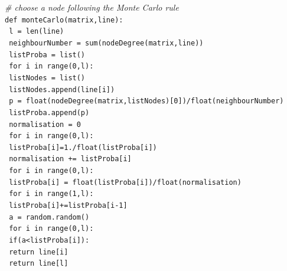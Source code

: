 \documentclass[a4paper]{report}
\begin{document}
\medbreak
\noindent     \textit{\# choose a node following the Monte Carlo rule}\\
\noindent     \texttt{def monteCarlo(matrix,line):}\\
\hspace*{1cm} \texttt{	l = len(line)}\\
\hspace*{1cm} \texttt{	neighbourNumber = sum(nodeDegree(matrix,line))}\\
\hspace*{1cm} \texttt{	listProba = list()}\\
\hspace*{1cm} \texttt{	for i in range(0,l):}\\
\hspace*{2cm} \texttt{		listNodes = list()}\\
\hspace*{2cm} \texttt{		listNodes.append(line[i])}\\
\hspace*{2cm} \texttt{		p = float(nodeDegree(matrix,listNodes)[0])/float(neighbourNumber)}\\
\hspace*{2cm} \texttt{		listProba.append(p)}\\
\hspace*{1cm} \texttt{	normalisation = 0}\\
\hspace*{1cm} \texttt{	for i in range(0,l):}\\
\hspace*{2cm} \texttt{		listProba[i]=1./float(listProba[i])}\\
\hspace*{2cm} \texttt{		normalisation += listProba[i]}\\
\hspace*{1cm} \texttt{	for i in range(0,l):}\\
\hspace*{2cm} \texttt{		listProba[i] = float(listProba[i])/float(normalisation)}\\
\hspace*{1cm} \texttt{	for i in range(1,l):}\\
\hspace*{2cm} \texttt{		listProba[i]+=listProba[i-1]}\\
\hspace*{1cm} \texttt{	a = random.random()}\\
\hspace*{1cm} \texttt{	for i in range(0,l):}\\
\hspace*{2cm} \texttt{		if(a<listProba[i]):}\\
\hspace*{3cm} \texttt{			return line[i]}\\
\hspace*{1cm} \texttt{	return line[l]}\\
\medbreak
\end{document}
